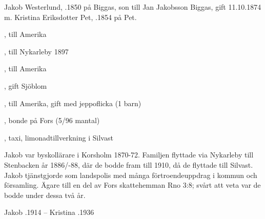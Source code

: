 






\lipsum[1-1]


\lipsum[2-6]


\lipsum[7-8]


Jakob Westerlund, .1850 på Biggas, son till Jan Jakobsson Biggas, gift 11.10.1874 m. Kristina Eriksdotter Pet, .1854 på Pet.
\begin{jhchildren}
  \item {}, till Amerika
  \item {}, till Nykarleby 1897
  \item {}, till Amerika
  \item {}, gift Sjöblom
  \item {}, till Amerika, gift med jeppoflicka (1 barn)
  \item {}, bonde på Fors (5/96 mantal)
  \item {}
  \item {}
  \item {}
  \item {}, taxi, limonadtillverkning i Silvast
\end{jhchildren}

Jakob var byskollärare i Korsholm 1870-72. Familjen flyttade via Nykarleby till Stenbacken år 1886/-88, där de bodde fram till 1910, då de flyttade till Silvast. Jakob tjänstgjorde som landspolis med många förtroendeuppdrag i kommun och församling. Ägare till en del av Fors skattehemman Rno 3:8; svårt att veta var de bodde under dessa två år.

Jakob .1914  -- 	Kristina .1936



